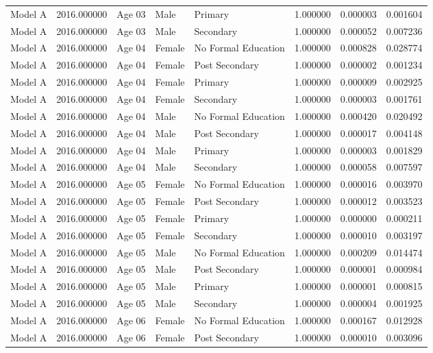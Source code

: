 \begin{table}[ht]
\begin{tabular}{lrlllrrr}
Model A & 2016.000000 & Age 03 & Male & Primary & 1.000000 & 0.000003 & 0.001604 \\
Model A & 2016.000000 & Age 03 & Male & Secondary & 1.000000 & 0.000052 & 0.007236 \\
Model A & 2016.000000 & Age 04 & Female & No Formal Education & 1.000000 & 0.000828 & 0.028774 \\
Model A & 2016.000000 & Age 04 & Female & Post Secondary & 1.000000 & 0.000002 & 0.001234 \\
Model A & 2016.000000 & Age 04 & Female & Primary & 1.000000 & 0.000009 & 0.002925 \\
Model A & 2016.000000 & Age 04 & Female & Secondary & 1.000000 & 0.000003 & 0.001761 \\
Model A & 2016.000000 & Age 04 & Male & No Formal Education & 1.000000 & 0.000420 & 0.020492 \\
Model A & 2016.000000 & Age 04 & Male & Post Secondary & 1.000000 & 0.000017 & 0.004148 \\
Model A & 2016.000000 & Age 04 & Male & Primary & 1.000000 & 0.000003 & 0.001829 \\
Model A & 2016.000000 & Age 04 & Male & Secondary & 1.000000 & 0.000058 & 0.007597 \\
Model A & 2016.000000 & Age 05 & Female & No Formal Education & 1.000000 & 0.000016 & 0.003970 \\
Model A & 2016.000000 & Age 05 & Female & Post Secondary & 1.000000 & 0.000012 & 0.003523 \\
Model A & 2016.000000 & Age 05 & Female & Primary & 1.000000 & 0.000000 & 0.000211 \\
Model A & 2016.000000 & Age 05 & Female & Secondary & 1.000000 & 0.000010 & 0.003197 \\
Model A & 2016.000000 & Age 05 & Male & No Formal Education & 1.000000 & 0.000209 & 0.014474 \\
Model A & 2016.000000 & Age 05 & Male & Post Secondary & 1.000000 & 0.000001 & 0.000984 \\
Model A & 2016.000000 & Age 05 & Male & Primary & 1.000000 & 0.000001 & 0.000815 \\
Model A & 2016.000000 & Age 05 & Male & Secondary & 1.000000 & 0.000004 & 0.001925 \\
Model A & 2016.000000 & Age 06 & Female & No Formal Education & 1.000000 & 0.000167 & 0.012928 \\
Model A & 2016.000000 & Age 06 & Female & Post Secondary & 1.000000 & 0.000010 & 0.003096 \\

\end{tabular}
\end{table}
